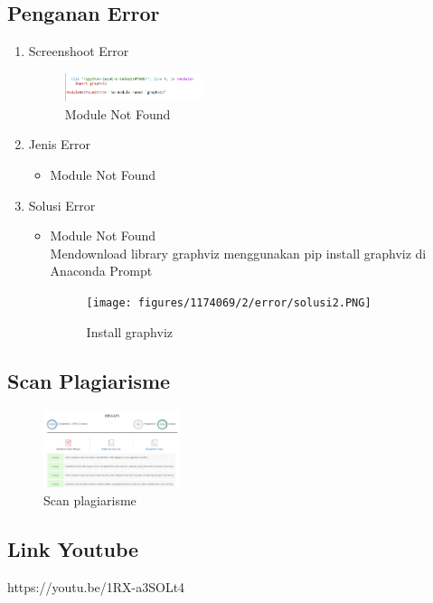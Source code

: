 \subsection{Penganan Error}
\begin{enumerate}
\item Screenshoot Error
	\begin{figure}
		\includegraphics[width=4cm]{figures/1174071/2/error/error.PNG}
		\centering
		\caption{Module Not Found}
	\end{figure}
	
\item Jenis Error
	\begin{itemize}
	\item Module Not Found
	\end{itemize}
	
\item Solusi Error
\begin{itemize}
	\item Module Not Found\\
	Mendownload library graphviz menggunakan pip install graphviz di Anaconda Prompt
	\begin{figure}
		\texttt{[image: figures/1174069/2/error/solusi2.PNG]}
		\centering
		\caption{Install graphviz}
	\end{figure}
	\end{itemize}
\end{enumerate}

\subsection{Scan Plagiarisme}
\begin{figure}
		\includegraphics[width=4cm]{figures/1174071/2/plagiarisme/plagiarisme.png}
		\centering
		\caption{Scan plagiarisme}
	\end{figure}
	
\subsection{Link Youtube}	
https://youtu.be/1RX-a3SOLt4
